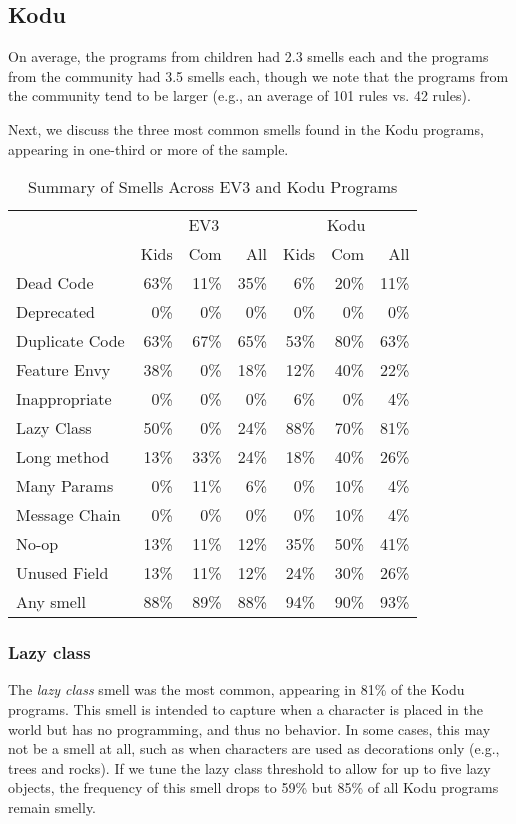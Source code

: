 \documentclass[conference]{IEEEtran}
\begin{document}
\subsection{Kodu}
On average, the programs from children had 2.3 smells each and the programs from the community had 3.5 smells each, though we note that the programs from the community tend to be larger (e.g., an average of 101 rules vs. 42 rules). 

Next, we discuss the three most common smells found in the Kodu programs, appearing in one-third or more of the sample. 



\begin{table}
\caption{Summary of Smells Across EV3 and Kodu Programs \label{tab:smellsummary}}
\begin{center}
\begin{tabular}{| l || r r | r || r r | r||} \cline{2-7}
\multicolumn{1}{c||}{}&\multicolumn{3}{c||}{EV3}&\multicolumn{3}{c||}{Kodu}\\ \cline{2-7}
\multicolumn{1}{c||}{}& Kids & Com & All & Kids & Com & All \\ \hline
Dead Code&63\%&11\%&35\%&6\%&20\%&11\%\\
Deprecated  & 0\% & 0\%& 0\% & 0\%& 0\% & 0\%\\
Duplicate Code&63\%&67\%&65\%&53\%&80\%&63\%\\
Feature Envy&38\%&0\%&18\%&12\%&40\%&22\%\\
Inappropriate &0\%&0\%&0\%&6\%&0\%&4\%\\
Lazy Class&50\%&0\%&24\%&88\%&70\%&81\%\\
Long method&13\%&33\%&24\%&18\%&40\%&26\%\\
Many Params&0\%&11\%&6\%&0\%&10\%&4\%\\
Message Chain&0\%&0\%&0\%&0\%&10\%&4\%\\
No-op&13\%&11\%&12\%&35\%&50\%&41\%\\
Unused Field&13\%&11\%&12\%&24\%&30\%&26\%\\ \hline\hline
Any smell & 88\%&89\%&88\% & 94\%&90\%&93\% \\ \hline
\end{tabular}
\end{center}
\vspace{-12pt}
\end{table}

\subsubsection{Lazy class}
The \emph{lazy class} smell was the most common, appearing in 81\% of the Kodu programs. This smell is intended to capture when a character is placed in the world but has no programming, and thus no behavior. In some cases, this may not be a smell at all, such as when characters are used as decorations only (e.g., trees and rocks). If we tune the lazy class threshold to allow for up to five lazy objects, the frequency of this smell  drops to 59\% but 85\% of all Kodu programs remain smelly. 
\end{document}
